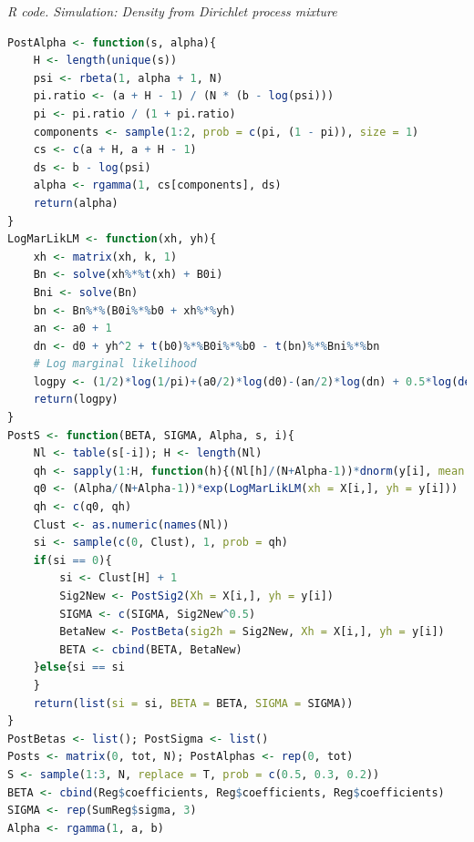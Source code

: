 \begin{enumerate}[leftmargin=*]
\begin{tcolorbox}[enhanced,width=4.67in,center upper,
	fontupper=\large\bfseries,drop shadow southwest,sharp corners]
	\textit{R code. Simulation: Density from Dirichlet process mixture}
	\begin{VF}
		\begin{lstlisting}[language=R]
PostAlpha <- function(s, alpha){
	H <- length(unique(s))
	psi <- rbeta(1, alpha + 1, N)
	pi.ratio <- (a + H - 1) / (N * (b - log(psi)))
	pi <- pi.ratio / (1 + pi.ratio)
	components <- sample(1:2, prob = c(pi, (1 - pi)), size = 1)
	cs <- c(a + H, a + H - 1)
	ds <- b - log(psi)
	alpha <- rgamma(1, cs[components], ds)
	return(alpha)
}
LogMarLikLM <- function(xh, yh){
	xh <- matrix(xh, k, 1)
	Bn <- solve(xh%*%t(xh) + B0i)
	Bni <- solve(Bn)
	bn <- Bn%*%(B0i%*%b0 + xh%*%yh)
	an <- a0 + 1
	dn <- d0 + yh^2 + t(b0)%*%B0i%*%b0 - t(bn)%*%Bni%*%bn 
	# Log marginal likelihood
	logpy <- (1/2)*log(1/pi)+(a0/2)*log(d0)-(an/2)*log(dn) + 0.5*log(det(Bn)/det(B0)) + lgamma(an/2)-lgamma(a0/2)
	return(logpy)
}
PostS <- function(BETA, SIGMA, Alpha, s, i){
	Nl <- table(s[-i]); H <- length(Nl)
	qh <- sapply(1:H, function(h){(Nl[h]/(N+Alpha-1))*dnorm(y[i], mean = t(X[i,])%*%BETA[,h], sd = SIGMA[h])})
	q0 <- (Alpha/(N+Alpha-1))*exp(LogMarLikLM(xh = X[i,], yh = y[i]))
	qh <- c(q0, qh)
	Clust <- as.numeric(names(Nl))
	si <- sample(c(0, Clust), 1, prob = qh)
	if(si == 0){
		si <- Clust[H] + 1
		Sig2New <- PostSig2(Xh = X[i,], yh = y[i])
		SIGMA <- c(SIGMA, Sig2New^0.5)
		BetaNew <- PostBeta(sig2h = Sig2New, Xh = X[i,], yh = y[i])
		BETA <- cbind(BETA, BetaNew)
	}else{si == si
	}
	return(list(si = si, BETA = BETA, SIGMA = SIGMA))
}
PostBetas <- list(); PostSigma <- list()
Posts <- matrix(0, tot, N); PostAlphas <- rep(0, tot)
S <- sample(1:3, N, replace = T, prob = c(0.5, 0.3, 0.2))
BETA <- cbind(Reg$coefficients, Reg$coefficients, Reg$coefficients)
SIGMA <- rep(SumReg$sigma, 3)
Alpha <- rgamma(1, a, b)
\end{lstlisting}
	\end{VF}
\end{tcolorbox}


\end{enumerate}
